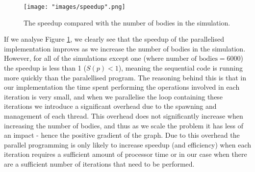 \documentclass[12pt, a4paper]{article}
\begin{document}
\renewcommand\refname{Bibliography}
\pagestyle{MainStyle}







\begin{figure}
\centering
\texttt{[image: "images/speedup".png]}
\caption{The speedup compared with the number of bodies in the simulation.}
\label{fig:one}
\end{figure}
\par If we analyse Figure \ref{fig:one}, we clearly see that the speedup of the parallelised implementation improves as we increase the  number of bodies in the simulation. However, for all of the simulations except one (where $\text{number of bodies} = 6000$) the speedup is less than 1 ($S(p) < 1$), meaning the sequential code is running more quickly than the paralellised program. The reasoning behind this is that in our implementation the time spent performing the operations involved in each iteration is very small, and when we parallelise the loop containing these iterations we introduce a significant overhead due to the spawning and management of each thread. This overhead does not significantly increase when increasing the number of bodies, and thus as we scale the problem it has less of an impact - hence the positive gradient of the graph. Due to this overhead the parallel programming is only likely to increase speedup (and efficiency) when each iteration requires a sufficient amount of processor time or in our case when there are a sufficient number of iterations that need to be performed.
\end{document}
